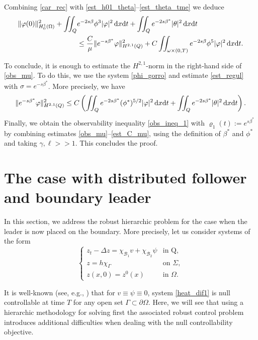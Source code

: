 \documentclass{dcds-bOF}
\theoremstyle{definition}
\def\cbd{\Gamma}
\newcommand\csin[1]{\chi_{#1}}
\def\dx{\,\textnormal{d}x}
\def\dt{\textnormal{d}t}
\begin{document}
Combining \eqref{car_rec} with \eqref{est_h01_theta}--\eqref{est_theta_tme} we deduce
%
\begin{equation}\label{obs_mu}
\begin{split}
\|\varphi(0)\|_{H_0^1(\Omega)}^2+\iint_{Q}&e^{-2s\beta}\phi^3|\varphi|^2\dx\dt+\iint_{Q}e^{-2s\beta^*}|\theta|^2\dx\dt \\
&\leq \frac{C}{\mu}\|e^{-s\beta^*}\varphi\|_{H^{2,1}(Q)}^2+ C\iint_{\omega\times(0,T)}e^{-2s\beta}\phi^5|\varphi|^2\dx\dt.
\end{split}
\end{equation}
%

To conclude, it is enough to estimate the $H^{2,1}$-norm in the right-hand side of \eqref{obs_mu}. To do this, we use the system \eqref{phi_gorro} and estimate \eqref{est_regul} with $\sigma=e^{-s\beta^*}$. More precisely, we have
%
\begin{equation}\label{est_C_mu}
\|e^{-s\beta^*}\varphi\|^2_{H^{2,1}(Q)}\leq C\left(\iint_{Q}e^{-2s\beta^*}(\phi^*)^{5/2}|\varphi|^2\dx\dt+\iint_{Q}e^{-2s\beta^*}|\theta|^2\dx\dt\right).
\end{equation}
%
Finally, we obtain the observability inequality \eqref{obs_ineq_1} with $\varrho_1(t):=e^{s\beta^*}$ by combining estimates \eqref{obs_mu}--\eqref{est_C_mu}, using the definition of $\beta^*$ and $\phi^*$ and taking $\gamma,\ell>>1$. This concludes the proof.

\section{The case with distributed follower and boundary leader}\label{sec_bound_leader}

In this section, we address the robust hierarchic problem for the case when the leader is now placed on the boundary. More precisely, let us consider systems of the form
%
\begin{equation}\label{heat_dif1}
\begin{cases}
z_t-\Delta z=\csin{\mathcal B_1}v+\csin{\mathcal B_2}\psi & \text{in Q}, \\
z=h\chi_{\cbd} &\text{on } \Sigma, \\
z(x,0)=z^0(x) & \text{in } \Omega.
\end{cases}
\end{equation}

It is well-known (see, e.g., \cite{ima_original,cara_guerrero}) that for $v\equiv\psi\equiv 0$, system \eqref{heat_dif1} is null controllable at time $T$ for any open set $\Gamma\subset\partial \Omega$. Here, we will see that using a hierarchic methodology for solving first the associated robust control problem introduces additional difficulties when dealing with the null controllability objective.
\end{document}
